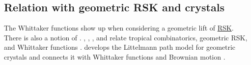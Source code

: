 \subsection[geometricWhittaker]{Relation with geometric RSK and crystals}

The Whittaker functions show up when
considering a geometric lift of \hyperref[rsk]{RSK}.
There is also a notion of \label{geometricCrystal}.
, , , and
 relate tropical combinatorics, geometric RSK, and
Whittaker functions \cite{CorwinOConnellSeppalainenZygouras2014}.
 develops the Littelmann path model for geometric crystals
and connects it with Whittaker functions and Brownian motion
\cite{Chhaibi2013x}.
